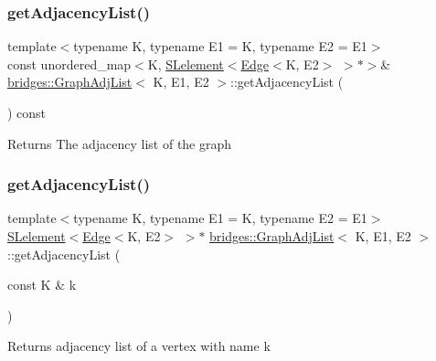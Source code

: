 \subsubsection{\texorpdfstring{get\+Adjacency\+List()}{getAdjacencyList()}\hspace{0.1cm}{\footnotesize\ttfamily [1/2]}}
{\footnotesize\ttfamily template$<$typename K, typename E1 = K, typename E2 = E1$>$ \\
const unordered\+\_\+map$<$K, \mbox{\hyperlink{classbridges_1_1_s_lelement}{S\+Lelement}}$<$\mbox{\hyperlink{classbridges_1_1_edge}{Edge}}$<$K, E2$>$ $>$$\ast$$>$\& \mbox{\hyperlink{classbridges_1_1_graph_adj_list}{bridges\+::\+Graph\+Adj\+List}}$<$ K, E1, E2 $>$\+::get\+Adjacency\+List (\begin{DoxyParamCaption}{ }\end{DoxyParamCaption}) const\hspace{0.3cm}{\ttfamily [inline]}}

\begin{DoxyReturn}{Returns}
The adjacency list of the graph 
\end{DoxyReturn}
\mbox{\label{classbridges_1_1_graph_adj_list_ab9eb791b7c242742ac832121f297acdc}} 
\subsubsection{\texorpdfstring{get\+Adjacency\+List()}{getAdjacencyList()}\hspace{0.1cm}{\footnotesize\ttfamily [2/2]}}
{\footnotesize\ttfamily template$<$typename K, typename E1 = K, typename E2 = E1$>$ \\
\mbox{\hyperlink{classbridges_1_1_s_lelement}{S\+Lelement}}$<$\mbox{\hyperlink{classbridges_1_1_edge}{Edge}}$<$K, E2$>$ $>$$\ast$ \mbox{\hyperlink{classbridges_1_1_graph_adj_list}{bridges\+::\+Graph\+Adj\+List}}$<$ K, E1, E2 $>$\+::get\+Adjacency\+List (\begin{DoxyParamCaption}\item[{const K \&}]{k }\end{DoxyParamCaption})\hspace{0.3cm}{\ttfamily [inline]}}

Returns adjacency list of a vertex with name k


